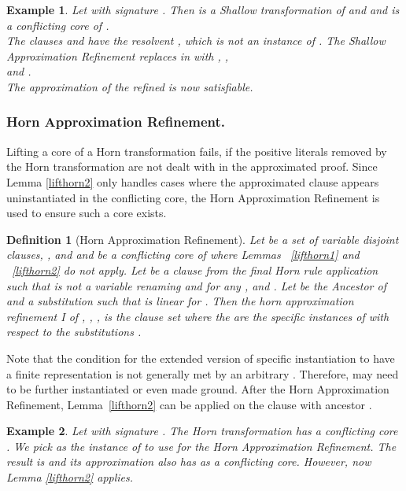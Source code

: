 \documentclass{llncs}
\newtheorem{defin}{Definition}
\newtheorem{exmp}{Example}
\begin{document}
\begin{exmp}
Let  with signature   .
Then   is a Shallow transformation of  and
and   is a conflicting core of .\\
The clauses  and  have the resolvent , which is not an instance of  .
The Shallow Approximation Refinement replaces  in  with , ,\\  and .\\
The approximation of the refined  is now satisfiable. 
\end{exmp}

\subsubsection{Horn Approximation Refinement.}
Lifting a core of a Horn transformation fails, if  the positive literals removed by 
the Horn transformation are not dealt with in the approximated proof.
Since Lemma \ref{lifthorn2} only handles cases where the approximated clause appears uninstantiated in the conflicting core,
the Horn Approximation Refinement is used to ensure such a core exists. 

\begin{defin}[Horn Approximation Refinement]
Let  be a set of variable disjoint clauses, 
,
 and  and
 be a conflicting core of  where Lemmas ~\ref{lifthorn1} and ~\ref{lifthorn2} do not apply.
Let  
 be a clause from the final Horn rule application such that  is not a variable renaming and
 for any , and . 
Let  be the Ancestor of 
and  a substitution such that  is linear for .
Then the \emph{horn approximation refinement I} of , , ,  is the clause
set  where the  are the specific
instances of  with respect to the substitutions .
\end{defin}

Note that the condition for the extended version of  specific instantiation to have a finite representation is not generally met by an arbitrary .
Therefore,  may need to be further instantiated or even made ground. 
After the Horn Approximation Refinement, Lemma~\ref{lifthorn2} can be applied on 
the clause with ancestor .

\begin{exmp}
Let  with signature . 
The Horn transformation  has a conflicting core 
.
We pick  as the instance of  to use for  the Horn Approximation Refinement.
The result is    
and its approximation also has  as a conflicting core.
However, now Lemma \ref{lifthorn2} applies.
\end{exmp} 
\end{document}
